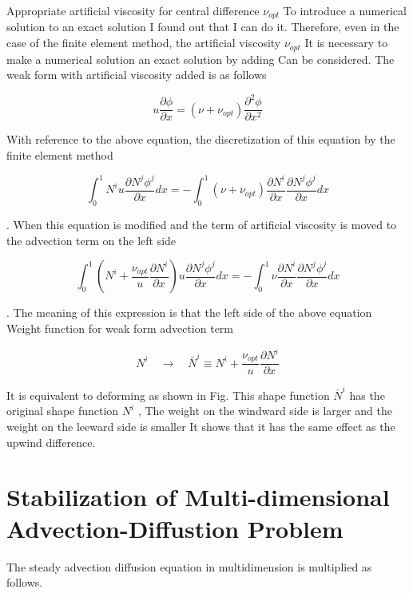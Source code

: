 Appropriate artificial viscosity for central difference $\nu_{opt}$
To introduce a numerical solution to an exact solution
I found out that I can do it.
Therefore, even in the case of the finite element method, the artificial viscosity $\nu_{opt}$
It is necessary to make a numerical solution an exact solution by adding
Can be considered.
The weak form with artificial viscosity added is as follows

\begin{equation}
u\frac{\partial\phi}{\partial x} = (\nu+\nu_{opt})\frac{\partial^2 \phi}{\partial x^2}
\end{equation}

With reference to the above equation, the discretization of this equation by the finite element method

\begin{equation}
{\int^1_0}{N^i}u\frac{\partial N^j\phi^j}{\partial x}dx = -{\int^1_0}(\nu+\nu_{opt}) \frac{\partial N^i}{\partial x}\frac{\partial N^j\phi^j}{\partial x}dx
\end{equation}

.
When this equation is modified and the term of artificial viscosity is moved to the advection term on the left side

\begin{equation}
 {\int^1_0}(N^i+\frac{\nu_{opt}}{u}\frac{\partial N^i}{\partial x})u \frac{\partial N^j\phi^j}{\partial x}dx = -{\int^1_0}\nu\frac{\partial N^i}{\partial x}\frac{\partial N^j\phi^j}{\partial x}dx
\end{equation}

. The meaning of this expression is that the left side of the above equation
Weight function for weak form advection term

\begin{equation}
 N^i \quad \rightarrow \quad \bar{N}^i\equiv N^i+\frac{\nu_{opt}}{u}\frac{\partial N^i}{\partial x}
\end{equation}

It is equivalent to deforming as shown in Fig.
This shape function $\bar{N}^i$ has the original shape function $N^i$
, The weight on the windward side is larger and the weight on the leeward side is smaller
It shows that it has the same effect as the upwind difference.



\section{Stabilization of Multi-dimensional Advection-Diffustion Problem}
%
The steady advection diffusion equation in multidimension is multiplied as follows.


